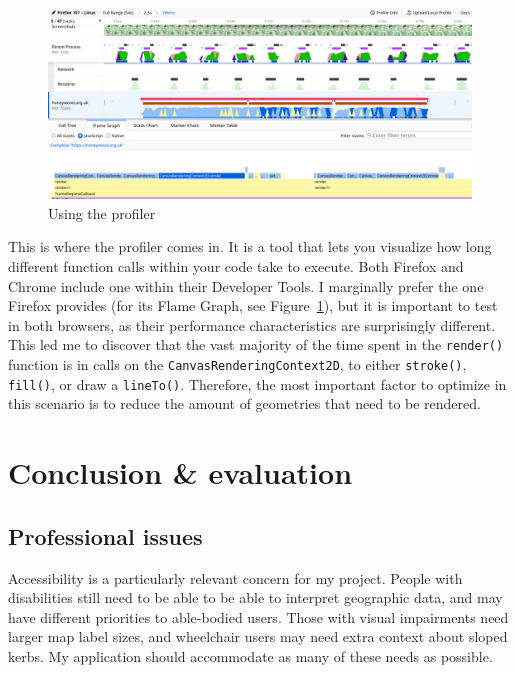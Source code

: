 \documentclass[hyphens]{final_report}
\begin{document}
\begin{figure}[ht]
    \centering
    \includegraphics[width=\textwidth]{../proof-of-concepts/4-rendering-osm-data/screenshots/profiling.png}
    \caption{Using the profiler}\label{fig:profiling}
\end{figure}

This is where the profiler comes in. It is a tool that lets you visualize how long different function calls within your code take to execute. Both Firefox and Chrome include one within their Developer Tools. I marginally prefer the one Firefox provides (for its Flame Graph, see Figure~\ref{fig:profiling}), but it is important to test in both browsers, as their performance characteristics are surprisingly different. This led me to discover that the vast majority of the time spent in the \texttt{render()} function is in calls on the \texttt{CanvasRenderingContext2D}, to either \texttt{stroke()}, \texttt{fill()}, or draw a \texttt{lineTo()}. Therefore, the most important factor to optimize in this scenario is to reduce the amount of geometries that need to be rendered.

\clearpage
\chapter{Conclusion \& evaluation}


\section{Professional issues}

Accessibility is a particularly relevant concern for my project. People with disabilities still need to be able to be able to interpret geographic data, and may have different priorities to able-bodied users. Those with visual impairments need larger map label sizes, and wheelchair users may need extra context about sloped kerbs. My application should accommodate as many of these needs as possible.
\end{document}
